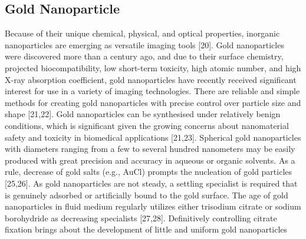 \documentclass[12pt]{article}
\begin{document}
\subsection*{Gold Nanoparticle} 
Because of their unique chemical, physical, and optical properties, inorganic nanoparticles are emerging as versatile imaging tools [20]. Gold nanoparticles were discovered more than a century ago, and due to their surface chemistry, projected biocompatibility, low short-term toxicity, high atomic number, and high X-ray absorption coefficient, gold nanoparticles have recently received significant interest for use in a variety of imaging technologies. There are reliable and simple methods for creating gold nanoparticles with precise control over particle size and shape [21,22]. Gold nanoparticles can be synthesised under relatively benign conditions, which is significant given the growing concerns about nanomaterial safety and toxicity in biomedical applications [21,23].
 Spherical gold nanoparticles with diameters ranging from a few to several hundred nanometers may be easily produced with great precision and accuracy in aqueous or organic solvents. As a rule, decrease of gold salts (e.g., AuCl) prompts the nucleation of gold particles [25,26]. As gold nanoparticles are not steady, a settling specialist is required that is genuinely adsorbed or artificially bound to the gold surface. The age of gold nanoparticles in fluid medium regularly utilizes either trisodium citrate or sodium borohydride as decreasing specialists [27,28]. Definitively controlling citrate fixation brings about the development of little and uniform gold nanoparticles
\end{document}
